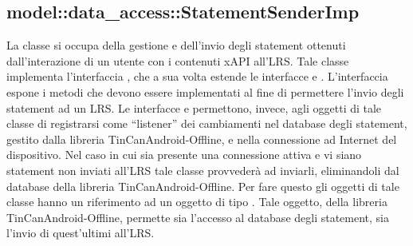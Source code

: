 \documentclass[../Tesi.tex]{subfiles}
\begin{document}
		\subsection{model::data\_access::StatementSenderImp}
		La classe  si occupa della gestione e dell'invio degli statement ottenuti dall'interazione di un utente con i contenuti xAPI all'LRS. Tale classe implementa l'interfaccia , che a sua volta estende le interfacce  e . L'interfaccia  espone i metodi che devono essere implementati al fine di permettere l'invio degli statement ad un LRS. Le interfacce  e  permettono, invece, agli oggetti di tale classe di registrarsi come ``listener'' dei cambiamenti nel database degli statement, gestito dalla libreria TinCanAndroid-Offline, e nella connessione ad Internet del dispositivo. Nel caso in cui sia presente una connessione attiva e vi siano statement non inviati all'LRS tale classe provvederà ad inviarli, eliminandoli dal database della libreria TinCanAndroid-Offline. Per fare questo gli oggetti di tale classe hanno un riferimento ad un oggetto di tipo . Tale oggetto, della libreria TinCanAndroid-Offline, permette sia l'accesso al database degli statement, sia l'invio di quest'ultimi all'LRS.
\end{document}
